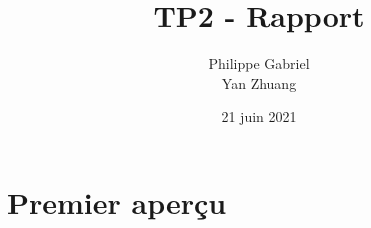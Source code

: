 \documentclass[10pt, titlepage]{article}
\begin{document}
\title{{\Huge \textbf{TP2 - Rapport}}}
\author{Philippe Gabriel \\ Yan Zhuang}
\date{21 juin 2021}

\maketitle

\setcounter{page}{2}

\newpage

\section{Premier aperçu}
\end{document}
